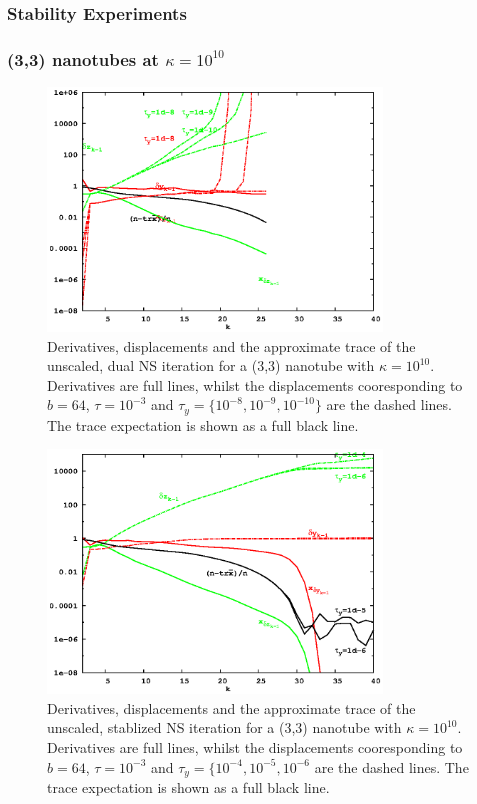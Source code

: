 \documentclass[letterpaper,twocolumn,amsmath,amsfont,amssymb,english,aps,jcp,preprintnumbers,groupaddress,nofootinbib,tightenlines]{revtex4}
\begin{document}
\pagebreak 

\subsubsection{Stability Experiments}

\subsubsection{(3,3) nanotubes at $\kappa=10^{10}$}


\begin{figure}[h]
\includegraphics[width=3.5in]{fig_33_tube_cond_10_noscaling/33_nanotube_cond10_noscale_dual.eps}
\caption{Derivatives, displacements and the approximate trace of the unscaled, dual NS iteration for a (3,3) nanotube with $\kappa =10^{10}$. 
Derivatives are full lines, whilst the displacements cooresponding to $b=64$, $\tau=10^{-3}$ and $\tau_y=\{10^{-8}, 10^{-9}, 10^{-10}\}$  
are the dashed lines.  The trace expectation is shown as a full black line. }
\end{figure}


\begin{figure}[h]
\includegraphics[width=3.5in]{fig_33_tube_cond_10_noscaling/33_nanotube_cond10_noscale_stab.eps}
\caption{Derivatives, displacements and the approximate trace of the unscaled, stablized NS iteration for a (3,3) 
nanotube with $\kappa =10^{10}$. 
Derivatives are full lines, whilst the displacements cooresponding to $b=64$, $\tau=10^{-3}$ and 
$\tau_y=\{10^{-4}, 10^{-5}, 10^{-6}$  are the dashed lines.  The trace expectation is shown as a full black line. }
\end{figure}
\end{document}
